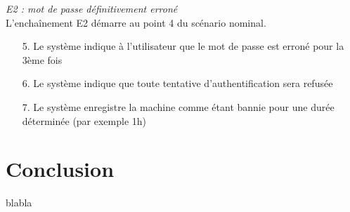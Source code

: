 \documentclass[12pt , a4paper]{article}
\begin{document}
\noindent\textit{E2 : mot de passe définitivement erroné}\\
L'encha\^inement E2 démarre au point 4 du scénario nominal.
\begin{enumerate}
\item[5.] Le système indique à l'utilisateur que le mot de passe est erroné pour la 3ème fois
\item[6.] Le système indique que toute tentative d'authentification sera refusée
\item[7.] Le système enregistre la machine comme étant bannie pour une durée déterminée (par exemple 1h)
\end{enumerate}

\newpage	
\section{Conclusion}
blabla
\end{document}
